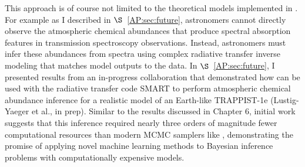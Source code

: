 This approach is of course not limited to the theoretical models implemented in \vplanet. For example as I described in $\S$~\ref{AP:sec:future}, astronomers cannot directly observe the atmospheric chemical abundances that produce spectral absorption features in transmission spectroscopy observations. Instead, astronomers must infer these abundances from spectra using complex radiative transfer inverse modeling that matches model outputs to the data. In $\S$~\ref{AP:sec:future}, I presented results from an in-progress collaboration that demonstrated how \approxposterior can be used with the radiative transfer code SMART \citep{Meadows1996,Crisp1997} to perform atmospheric chemical abundance inference for a realistic model of an Earth-like TRAPPIST-1e (Lustig-Yaeger et al., in prep). Similar to the results discussed in Chapter 6, initial work suggests that this inference required nearly three orders of magnitude fewer computational resources than modern MCMC samplers like \emcee, demonstrating the promise of applying novel machine learning methods to Bayesian inference problems with computationally expensive models.

